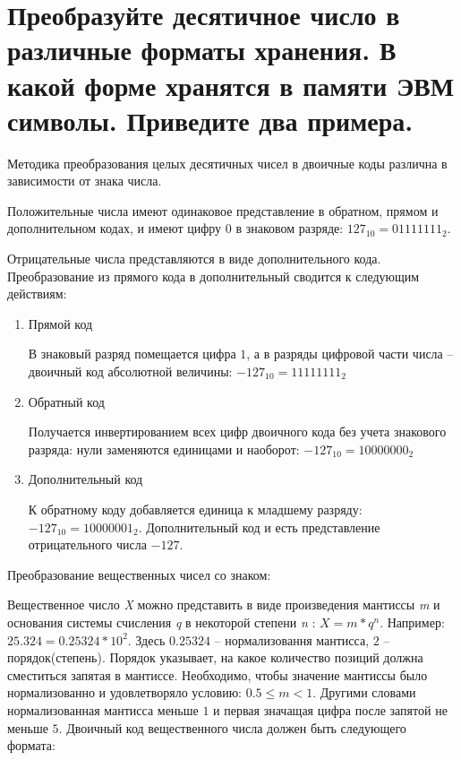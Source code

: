 \documentclass[unicode, 12pt, a4paper, oneside]{article}
\begin{document}
\section{Преобразуйте десятичное число в различные форматы хранения. В какой форме хранятся в памяти ЭВМ символы. Приведите два примера.}

Методика преобразования целых десятичных чисел в двоичные коды различна в зависимости от знака числа.

Положительные числа имеют одинаковое представление в обратном, прямом и дополнительном кодах, и имеют цифру $ 0$ в знаковом разряде: $127_{10}=01111111_{2}$.

Отрицательные числа представляются в виде дополнительного кода. Преобразование из прямого кода в дополнительный сводится к следующим действиям:
\begin{enumerate}
\item Прямой код

В знаковый разряд помещается цифра $ 1 $, а в разряды цифровой части числа – двоичный код абсолютной величины: $-127_{10}=11111111_{2}$
\item Обратный код

Получается инвертированием всех цифр двоичного кода без учета знакового разряда: нули заменяются единицами и наоборот: $-127_{10}=10000000_{2}$
\item Дополнительный код

К обратному коду добавляется единица к младшему разряду: $-127_{10}=10000001_{2}$.
Дополнительный код и есть представление отрицательного числа $-127$.
\end{enumerate}  

Преобразование вещественных чисел со знаком:

Вещественное число {\it X} можно представить в виде произведения мантиссы {\it m } и основания системы счисления {\it q } в некоторой степени {\it n } : $ X=m \ast q^{n} $. 
Например: $ 25.324 = 0.25324\ast 10^{2} $. Здесь $ 0.25324 $ – нормализовання мантисса, $ 2 $ – порядок(степень). Порядок указывает, на какое количество позиций должна сместиться запятая в мантиссе. Необходимо, чтобы значение мантиссы было нормализованно и удовлетворяло условию: $ 0.5 \leq m < 1 $. Другими словами нормализованная мантисса меньше $ 1 $ и первая значащая цифра после запятой не меньше $ 5 $. 
Двоичный код вещественного числа должен быть следующего формата:
\end{document}
